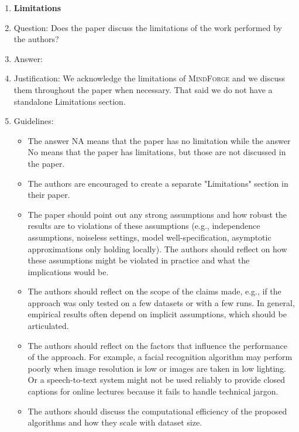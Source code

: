 \documentclass{article}
\newcommand{\collabvoyager}[0]{\mbox{\textsc{MindForge}}\xspace}
\begin{document}
\begin{enumerate}
\item {\bf Limitations}
    \item[] Question: Does the paper discuss the limitations of the work performed by the authors?
    \item[] Answer: \answerNo{} %
    \item[] Justification: %
    We acknowledge the limitations of \collabvoyager and we discuss them throughout the paper when necessary. That said we do not have a standalone Limitations section.
    \item[] Guidelines:
    \begin{itemize}
        \item The answer NA means that the paper has no limitation while the answer No means that the paper has limitations, but those are not discussed in the paper. 
        \item The authors are encouraged to create a separate "Limitations" section in their paper.
        \item The paper should point out any strong assumptions and how robust the results are to violations of these assumptions (e.g., independence assumptions, noiseless settings, model well-specification, asymptotic approximations only holding locally). The authors should reflect on how these assumptions might be violated in practice and what the implications would be.
        \item The authors should reflect on the scope of the claims made, e.g., if the approach was only tested on a few datasets or with a few runs. In general, empirical results often depend on implicit assumptions, which should be articulated.
        \item The authors should reflect on the factors that influence the performance of the approach. For example, a facial recognition algorithm may perform poorly when image resolution is low or images are taken in low lighting. Or a speech-to-text system might not be used reliably to provide closed captions for online lectures because it fails to handle technical jargon.
        \item The authors should discuss the computational efficiency of the proposed algorithms and how they scale with dataset size.

\end{itemize}
\end{enumerate}
\end{document}
